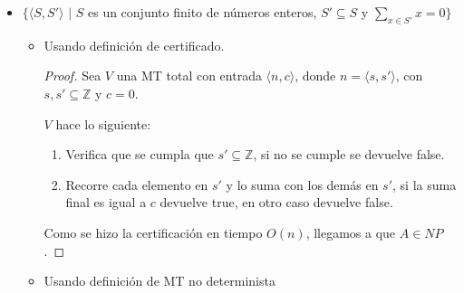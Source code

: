\documentclass[letterpaper,10pt]{article}
\begin{document}
\begin{enumerate}
\begin{itemize}
\begin{itemize}
\begin{proof}
\begin{enumerate}[1)]
     					\item Sea $c=\langle a,b \rangle$, ejecuta $V\langle a,b \rangle$, si $V$ acepta entonces $N$ devuelve true, en otro caso devuelve false.
     				
                    \end{enumerate}
     				
                    Como dimos una MT no determinista que decide a $A$ en tiempo
                    $O(n)$, llegamos a que $A\in NP$.
                    
     			\end{proof}
     			    
     	\end{itemize}
         	
         
         \item $\{\langle S, S' \rangle$ $|$ $S$ es un conjunto finito de 
         números enteros, $S' \subseteq S$  y $\sum_{x \in S'} x = 0\}$
         
         \begin{itemize}
             
         	\item Usando definición de certificado.
         	
            \begin{proof}
         		Sea $V$ una MT total con entrada $\langle n,c \rangle$, donde $n=\langle s,s' \rangle$, con $s,s'\subseteq\mathbb{Z}$ y $c = 0$. 
         		
         		$V$ hace lo siguiente:
         		\begin{enumerate}[1)]
                    
         			\item Verifica que se cumpla que $s'\subseteq \mathbb{Z}$, si no se cumple se devuelve false.
         			
         			\item Recorre cada elemento en $s'$ y lo suma con los demás en $s'$, si la suma final es igual a $c$ devuelve true, en otro caso devuelve false.
         		
                \end{enumerate}
         		
                Como se hizo la certificación en tiempo $O(n)$, llegamos a que
                $A\in NP$. 
         	
            \end{proof}
         	
         	\item Usando definición de MT no determinista
         	

\end{itemize}
\end{itemize}
\end{enumerate}
\end{document}

